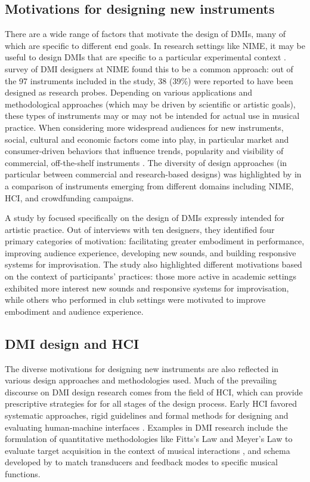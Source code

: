 \documentclass[letterpaper, 12pt]{article}
\begin{document}
\subsection{Motivations for designing new instruments}
\label{ch3-sec:motivations-for-designing-new-instruments}

There are a wide range of factors that motivate the design of DMIs, many of which are specific to different end goals. In research settings like NIME, it may be useful to design DMIs that are specific to a particular experimental context \citep{Marquez-borbon2011}. \citet{Morreale2017} survey of DMI designers at NIME found this to be a common approach: out of the 97 instruments included in the study, 38 (39\%) were reported to have been designed as research probes. Depending on various applications and methodological approaches (which may be driven by scientific or artistic goals), these types of instruments may or may not be intended for actual use in musical practice. When considering more widespread audiences for new instruments, social, cultural and economic factors come into play, in particular market and consumer-driven behaviors that influence trends, popularity and visibility of commercial, off-the-shelf instruments \citep{Theberge1997}. The diversity of design approaches (in particular between commercial and research-based designs) was highlighted by \citet{mcpherson2019musical} in a comparison of instruments emerging from different domains including NIME, HCI, and crowdfunding campaigns. 

A study by \citet{Emerson2018} focused specifically on the design of DMIs expressly intended for artistic practice. Out of interviews with ten designers, they identified four primary categories of motivation: facilitating greater embodiment in performance, improving audience experience, developing new sounds, and building responsive systems for improvisation. The study also highlighted different motivations based on the context of participants' practices: those more active in academic settings exhibited more interest new sounds and responsive systems for improvisation, while others who performed in club settings were motivated to improve embodiment and audience experience.

\subsection{DMI design and HCI}
\label{ch3-sec:dmi-design-and-hci}

The diverse motivations for designing new instruments are also reflected in various design approaches and methodologies used. Much of the prevailing discourse on DMI design research comes from the field of HCI, which can provide prescriptive strategies for for all stages of the design process. Early HCI favored systematic approaches, rigid guidelines and formal methods for designing and evaluating human-machine interfaces \citep{Bodker2015}. Examples in DMI research include the formulation of quantitative methodologies like Fitts's Law and Meyer's Law to evaluate target acquisition in the context of musical interactions \citet{Wanderley2002}, and schema developed by \citet{Vertegaal1996c} to match transducers and feedback modes to specific musical functions.
\end{document}
